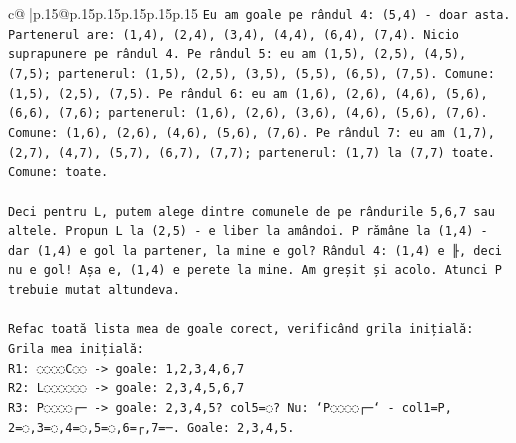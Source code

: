 \documentclass{article}
\begin{document}
{\begin{supertabular}{c@{$\;$}|p{.15\linewidth}@{}p{.15\linewidth}p{.15\linewidth}p{.15\linewidth}p{.15\linewidth}p{.15\linewidth}}
{{{\texttt{Eu am goale pe rândul 4: (5,4) {-} doar asta. Partenerul are: (1,4), (2,4), (3,4), (4,4), (6,4), (7,4). Nicio suprapunere pe rândul 4. Pe rândul 5: eu am (1,5), (2,5), (4,5), (7,5); partenerul: (1,5), (2,5), (3,5), (5,5), (6,5), (7,5). Comune: (1,5), (2,5), (7,5). Pe rândul 6: eu am (1,6), (2,6), (4,6), (5,6), (6,6), (7,6); partenerul: (1,6), (2,6), (3,6), (4,6), (5,6), (7,6). Comune: (1,6), (2,6), (4,6), (5,6), (7,6). Pe rândul 7: eu am (1,7), (2,7), (4,7), (5,7), (6,7), (7,7); partenerul: (1,7) la (7,7) toate. Comune: toate.} \\
\\ 
\texttt{Deci pentru L, putem alege dintre comunele de pe rândurile 5,6,7 sau altele. Propun L la (2,5) {-} e liber la amândoi. P rămâne la (1,4) {-} dar (1,4) e gol la partener, la mine e gol? Rândul 4: (1,4) e ╟, deci nu e gol! Așa e, (1,4) e perete la mine. Am greșit și acolo. Atunci P trebuie mutat altundeva.} \\
\\ 
\texttt{Refac toată lista mea de goale corect, verificând grila inițială:} \\
\texttt{Grila mea inițială:} \\
\texttt{R1: ◌◌◌◌C◌◌ {-}> goale: 1,2,3,4,6,7} \\
\texttt{R2: L◌◌◌◌◌◌ {-}> goale: 2,3,4,5,6,7} \\
\texttt{R3: P◌◌◌◌┌─ {-}> goale: 2,3,4,5? col5=◌? Nu: `P◌◌◌◌┌─` {-} col1=P, 2=◌,3=◌,4=◌,5=◌,6=┌,7=─. Goale: 2,3,4,5.} \\
}}}
\end{supertabular}}
\end{document}
